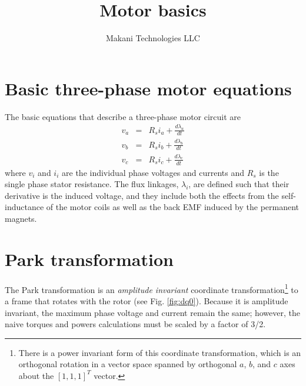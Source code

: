 \documentclass[11pt]{amsart}
\title{Motor basics}
\author{Makani Technologies LLC}
\begin{document}
\maketitle

\section{Basic three-phase motor equations}

The basic equations that describe a three-phase motor circuit are
%
\begin{eqnarray}
  \label{eqn:motor_abc}
  v_a &=& R_s i_a + \frac{d\lambda_a}{dt} \\
  v_b &=& R_s i_b + \frac{d\lambda_b}{dt} \\
  v_c &=& R_s i_c + \frac{d\lambda_c}{dt}
\end{eqnarray}
%
where $v_i$ and $i_i$ are the individual phase voltages and currents
and $R_s$ is the single phase stator resistance.  The flux linkages,
$\lambda_i$, are defined such that their derivative is the induced
voltage, and they include both the effects from the self-inductance of
the motor coils as well as the back EMF induced by the permanent
magnets.


\section{Park transformation}

The Park transformation is an \textit{amplitude invariant} coordinate
transformation\footnote{There is a power invariant form of this
  coordinate transformation, which is an orthogonal rotation in a
  vector space spanned by orthogonal $a$, $b$, and $c$ axes about the
  $[1,1,1]^T$ vector.}  to a frame that rotates with the rotor (see
Fig. \ref{fig:dq0}).  Because it is amplitude invariant, the maximum
phase voltage and current remain the same; however, the naive torques
and powers calculations must be scaled by a factor of 3/2.
\end{document}
